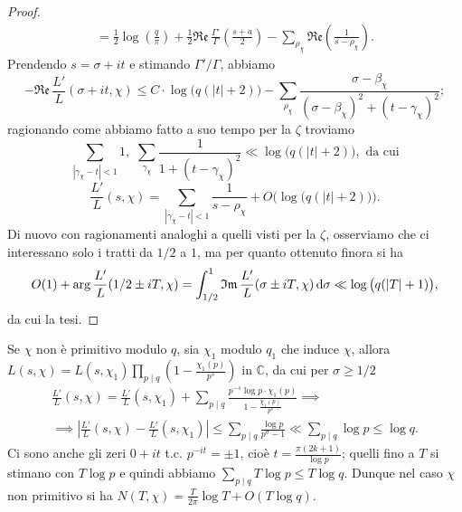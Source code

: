 \begin{proof}
\begin{gather*}
    =\frac{1}{2}\log\left(\frac{q}{\pi}\right)+\frac{1}{2}\mathfrak{Re}\,\frac{\Gamma'}{\Gamma}\left(\frac{s+a}{2}\right)-\sum_{\rho_\chi}\mathfrak{Re}\left(\frac{1}{s-\rho_\chi}\right).
  \end{gather*}
  Prendendo $s=\sigma+it$ e stimando $\Gamma'/\Gamma$, abbiamo
  $$-\mathfrak{Re}\,\frac{L'}{L}(\sigma+it,\chi) \le C\cdot\log\big(q(|t|+2)\big)-\sum_{\rho_\chi} \frac{\sigma-\beta_\chi}{(\sigma-\beta_\chi)^2+(t-\gamma_\chi)^2};$$
  ragionando come abbiamo fatto a suo tempo per la $\zeta$ troviamo
  $$\sum_{|\gamma_\chi-t|<1} 1, \,\, \sum_{\gamma_\chi}\frac{1}{1+(t-\gamma_\chi)^2} \ll \log\big(q(|t|+2)\big), \text{ da cui}$$
  $$\frac{L'}{L}(s,\chi)=\sum_{|\gamma_\chi-t|<1} \frac{1}{s-\rho_\chi}+O\Big(\log\big(q(|t|+2)\big)\Big).$$
  Di nuovo con ragionamenti analoghi a quelli visti per la $\zeta$, osserviamo che ci interessano solo i tratti da $1/2$ a $1$, ma per quanto ottenuto finora si ha
  $$O(1)+\arg\frac{L'}{L}(1/2 \pm iT,\chi)=\int_{1/2}^1 \mathfrak{Im}\,\frac{L'}{L}(\sigma \pm iT,\chi)\mathop{}\!\mathrm{d}\sigma \ll \log\big(q(|T|+1)\big),$$
  da cui la tesi.
\end{proof}

\begin{oss}
  Se $\chi$ non è primitivo modulo $q$, sia $\chi_1$ modulo $q_1$ che induce $\chi$, allora $\displaystyle L(s,\chi)=L(s,\chi_1)\prod_{p \mid q}\left(1-\frac{\chi_1(p)}{p^s}\right)$ in $\mathbb{C}$, da cui per $\sigma \ge 1/2$
  \begin{gather*}
    \frac{L'}{L}(s,\chi)=\frac{L'}{L}(s,\chi_1)+\sum_{p \mid q} \frac{p^{-s}\log{p}\cdot\chi_1(p)}{1-\frac{\chi_1(p)}{p^s}} \implies \\
    \implies \left|\frac{L'}{L}(s,\chi)-\frac{L'}{L}(s,\chi_1)\right| \le \sum_{p \mid q} \frac{\log{p}}{p^{\sigma}-1} \ll \sum_{p \mid q} \log{p} \le \log{q}.
  \end{gather*}
  Ci sono anche gli zeri $0+it$ t.c. $p^{-it}=\pm 1$, cioè $t=\frac{\pi(2k+1)}{\log{p}}$; quelli fino a $T$ si stimano con $T\log{p}$ e quindi abbiamo $\displaystyle \sum_{p \mid q} T\log{p} \le T\log{q}$. Dunque nel caso $\chi$ non primitivo si ha $N(T,\chi)=\frac{T}{2\pi}\log{T}+O(T\log{q})$.
\end{oss}
